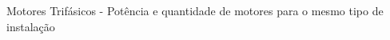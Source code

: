 \documentclass[12pt,openright,oneside,a4paper,brazil]{abntex2}
\begin{document}
\begin{table}[H] %
\centering

\begin{sideways}
    \begin{minipage}{\textwidth}
        \centering
        \caption{Motores Trifásicos - Potência e quantidade de motores para o mesmo tipo de instalação}
        \label{tab:motores_trifasicos}
        \vspace{0.15cm} %
        \setlength{\tabcolsep}{8pt} %
        \renewcommand{\arraystretch}{1.3} %


\end{minipage}
\end{sideways}
\end{table}
\end{document}
